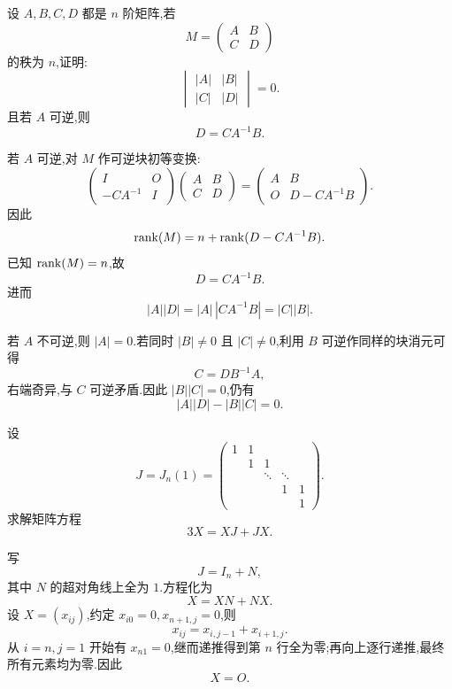 \begin{example}
设 $A,B,C,D$ 都是 $n$ 阶矩阵,若
\[
M=\begin{pmatrix}A&B\\C&D\end{pmatrix}
\]
的秩为 $n$,证明:
\[
\begin{vmatrix}|A|&|B|\\|C|&|D|\end{vmatrix}=0.
\]
且若 $A$ 可逆,则
\[
D=CA^{-1}B.
\]
\end{example}
\exampleblank

\begin{solution}
若 $A$ 可逆,对 $M$ 作可逆块初等变换:
\[
\begin{pmatrix}I&O\\-CA^{-1}&I\end{pmatrix}
\begin{pmatrix}A&B\\C&D\end{pmatrix}
=
\begin{pmatrix}A&B\\O&D-CA^{-1}B\end{pmatrix}.
\]
因此
\[
\operatorname{rank}(M)=n+\operatorname{rank}(D-CA^{-1}B).
\]
已知 $\operatorname{rank}(M)=n$,故
\[
\boxed{D=CA^{-1}B}.
\]
进而
\[
|A||D|=|A|\,|CA^{-1}B|=|C||B|.
\]

若 $A$ 不可逆,则 $|A|=0$.若同时 $|B|\neq0$ 且 $|C|\neq0$,利用 $B$ 可逆作同样的块消元可得
\[
C=DB^{-1}A,
\]
右端奇异,与 $C$ 可逆矛盾.因此 $|B||C|=0$,仍有
\[
|A||D|-|B||C|=0.
\]
\end{solution}

\begin{example}
设
\[
J=J_n(1)=
\begin{pmatrix}
1&1&&&\\
&1&1&&\\
&&\ddots&\ddots&\\
&&&1&1\\
&&&&1
\end{pmatrix}.
\]
求解矩阵方程
\[
3X=XJ+JX.
\]
\end{example}
\exampleblank

\begin{solution}
写
\[
J=I_n+N,
\]
其中 $N$ 的超对角线上全为 $1$.方程化为
\[
X=XN+NX.
\]
设 $X=(x_{ij})$,约定 $x_{i0}=0,x_{n+1,j}=0$,则
\[
x_{ij}=x_{i,j-1}+x_{i+1,j}.
\]
从 $i=n,j=1$ 开始有 $x_{n1}=0$,继而递推得到第 $n$ 行全为零;再向上逐行递推,最终所有元素均为零.因此
\[
\boxed{X=O}.
\]
\end{solution}


